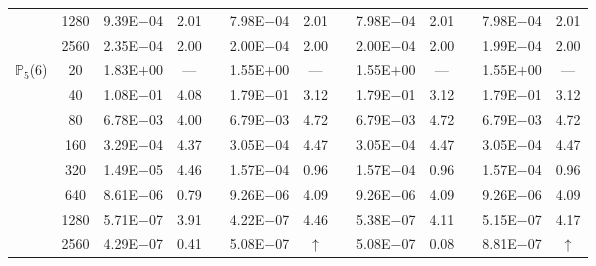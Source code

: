 \begin{table}[H]
{\begin{tabular}{@{}l c c c c c c c c c c c c@{}}
 & 1280 & 9.39E$-$04 & 2.01 &  & 7.98E$-$04 & 2.01 &  & 7.98E$-$04 & 2.01 &  & 7.98E$-$04 & 2.01\\
 & 2560 & 2.35E$-$04 & 2.00 &  & 2.00E$-$04 & 2.00 &  & 2.00E$-$04 & 2.00 &  & 1.99E$-$04 & 2.00\\
\midrule
\multirow{8}{*}{$\mathbb{P}_{5}$(6)}
 & 20 & 1.83E$+$00 & --- &  & 1.55E$+$00 & --- &  & 1.55E$+$00 & --- &  & 1.55E$+$00 & ---\\
 & 40 & 1.08E$-$01 & 4.08 &  & 1.79E$-$01 & 3.12 &  & 1.79E$-$01 & 3.12 &  & 1.79E$-$01 & 3.12\\
 & 80 & 6.78E$-$03 & 4.00 &  & 6.79E$-$03 & 4.72 &  & 6.79E$-$03 & 4.72 &  & 6.79E$-$03 & 4.72\\
 & 160 & 3.29E$-$04 & 4.37 &  & 3.05E$-$04 & 4.47 &  & 3.05E$-$04 & 4.47 &  & 3.05E$-$04 & 4.47\\
 & 320 & 1.49E$-$05 & 4.46 &  & 1.57E$-$04 & 0.96 &  & 1.57E$-$04 & 0.96 &  & 1.57E$-$04 & 0.96\\
 & 640 & 8.61E$-$06 & 0.79 &  & 9.26E$-$06 & 4.09 &  & 9.26E$-$06 & 4.09 &  & 9.26E$-$06 & 4.09\\
 & 1280 & 5.71E$-$07 & 3.91 &  & 4.22E$-$07 & 4.46 &  & 5.38E$-$07 & 4.11 &  & 5.15E$-$07 & 4.17\\
 & 2560 & 4.29E$-$07 & 0.41 &  & 5.08E$-$07 & $\uparrow$ &  & 5.08E$-$07 & 0.08 &  & 8.81E$-$07 & $\uparrow$\\
\bottomrule
\end{tabular}}
\label{PRO:bending:01_01_glob6_pro6}
\end{table}
